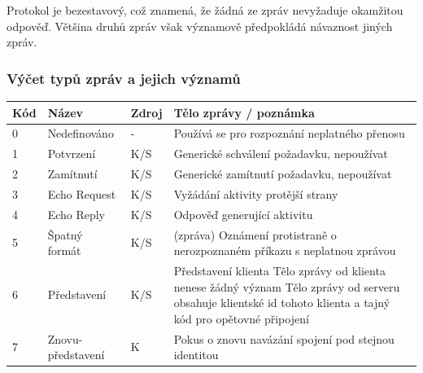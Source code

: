 \documentclass[12pt,a4paper]{article}
\begin{document}
Protokol je bezestavový, což znamená, že žádná ze zpráv nevyžaduje okamžitou odpověď. Většina druhů zpráv však významově předpokládá návaznost jiných zpráv.

\subsubsection{Výčet typů zpráv a jejich významů}
\begin{table}[h]
\center
\begin{tabular}{|l|p{3cm}|l|p{10cm}|}
\hline
\textbf{Kód} & \textbf{Název} & \textbf{Zdroj} & \textbf{Tělo zprávy / poznámka}\\ \hline
0 & Nedefinováno & - & Používá se pro rozpoznání neplatného přenosu \\ \hline
1 & Potvrzení & K/S & Generické schválení požadavku, nepoužívat \\ \hline
2 & Zamítnutí & K/S & Generické zamítnutí požadavku, nepoužívat \\ \hline
3 & Echo Request & K/S & Vyžádání aktivity protější strany \\ \hline
4 & Echo Reply & K/S & Odpověď generující aktivitu \\ \hline
5 & Špatný formát & K/S & (zpráva) Oznámení protistraně o nerozpoznaném příkazu s neplatnou zprávou\\ \hline
6 & Představení & K/S & Představení klienta \newline Tělo zprávy od klienta nenese žádný význam \newline Tělo zprávy od serveru obsahuje klientské id tohoto klienta a tajný kód pro opětovné připojení \\ \hline
7 & Znovu-představení & K & Pokus o znovu navázání spojení pod stejnou identitou \\ \hline

\end{tabular}
\end{table}
\end{document}
